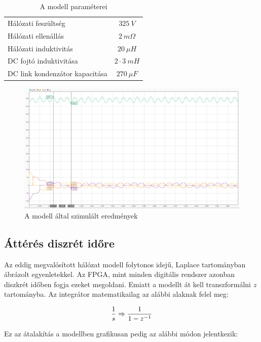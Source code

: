 \begin{table}[H]
\centering
\begin{tabular}{lS}
Hálózati feszültség            & $325\ V$ 		\\
Hálózati ellenállás            & $2\ m\Omega$   \\
Hálózati induktivitás          & $20\ \mu{}H$    			\\
DC fojtó induktivitása         & $2 \cdot{} 3\ mH$    			\\
DC link kondenzátor kapacitása & $270\ \mu{}F $   
\end{tabular}
\caption{A modell paraméterei}
\label{parameters}
\end{table}

\begin{figure}[H]
	\centering
	\includegraphics[width = \textwidth]{figures/continous_testrun_1.png}
	\caption{A modell által szimulált eredmények} 
	\label{fig:cont_run}
\end{figure}

\subsection{Áttérés diszrét időre}

Az eddig megvalósított hálózat modell folytonos idejű, Laplace tartományban ábrázolt egyenletekkel. Az FPGA, mint minden digitális rendszer azonban diszkrét időben fogja ezeket megoldani. Emiatt a modellt át kell transzformálni \emph{z} tartományba. Az integrátor matematikailag az alábbi alaknak felel meg:

\begin{equation}
\centering
\frac{1}{s} \Rightarrow \frac{1}{1-z^{-1}}
\end{equation}

Ez az átalakítás a modellben grafikusan pedig az alábbi módon jelentkezik:

